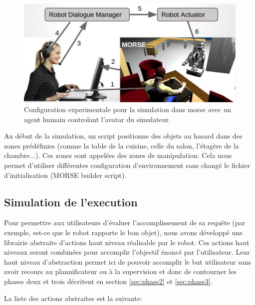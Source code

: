 \documentclass[a4paper,11pt,twoside]{StyleThese}
\begin{document}
\begin{figure}[ht!]
 \centering
  \includegraphics[width=0.89\linewidth]{./img/simusetup.jpg} 
  \caption {Configuration experimentale pour la simulation dans morse avec un agent humain controlant l'avatar du simulateur.}
  \label{fig:simusetup}
\end{figure}

 
Au début de la simulation, un script positionne des objets au hasard dans des zones prédéfinies (comme la table de la cuisine, celle du salon, l'étagère de la chambre...). Ces zones sont appelées des zones de manipulation. Cela nous permet d'utiliser différentes configuration d'environnement sans changé le fichier d'initialisation (MORSE builder script).

\subsection{Simulation de l'execution}
\label{section:actions}
Pour permettre aux utilisateurs d'évaluer l'accomplissement de sa requête (par exemple, est-ce que le robot rapporte le bon objet), nous avons développé une librairie abstraite d'actions haut niveau réalisable par le robot. Ces actions haut niveaux seront combinées pour accomplir l'objectif énoncé par l'utilisateur. Leur haut niveau d'abstraction permet ici de pouvoir accomplir le but utilisateur sans avoir recours au plannificateur ou à la supervision et donc de contourner les phases deux et trois décritent en section \ref{sec:phase2} et \ref{sec:phase3}.

La liste des actions abstraites est la suivante:
\end{document}
